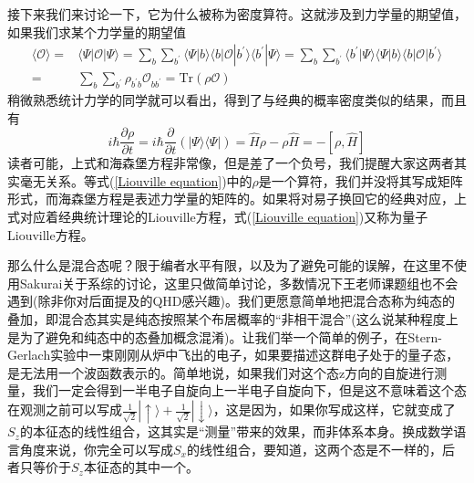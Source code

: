 \documentclass[12pt,a4paper,openany,twoside]{book}
\numberwithin{equation}{section}
\begin{document}
        接下来我们来讨论一下，它为什么被称为密度算符。这就涉及到力学量的期望值，如果我们求某个力学量的期望值
        \begin{equation}
          \begin{aligned}
            \langle\mathcal{O}\rangle=&\langle \Psi | \mathcal{O} | \Psi \rangle=\sum_{b}\sum_{b^\prime} \langle \Psi | b \rangle \langle b | \mathcal{O} | b^\prime \rangle \langle b^\prime | \Psi \rangle=\sum_{b}\sum_{b^\prime} \langle b^\prime | \Psi \rangle \langle \Psi | b \rangle \langle b | \mathcal{O} | b^\prime \rangle \\
            =&\sum_{b}\sum_{b^\prime}\rho_{b^\prime b}\mathcal{O}_{b b^\prime}=\text{Tr}(\rho \mathcal{O})
          \end{aligned}
        \end{equation}
        稍微熟悉统计力学的同学就可以看出，得到了与经典的概率密度类似的结果，而且有
        \begin{equation}
          i \hbar \frac{\partial \rho}{\partial t}=i \hbar \frac{\partial}{\partial t} \left(| \Psi \rangle \langle \Psi |\right)=\hat{H}\rho-\rho\hat{H}=-\left[\rho,\hat{H}\right]
          \label{Liouville equation}
        \end{equation}
        读者可能，上式和海森堡方程非常像，但是差了一个负号，我们提醒大家这两者其实毫无关系。等式(\ref{Liouville equation})中的$\rho$是一个算符，我们并没将其写成矩阵形式，而海森堡方程是表述力学量的矩阵的。如果将对易子换回它的经典对应，上式对应着经典统计理论的Liouville方程，式(\ref{Liouville equation})又称为量子Liouville方程。

        那么什么是混合态呢？限于编者水平有限，以及为了避免可能的误解，在这里不使用Sakurai关于系综的讨论\cite{J.J.Sakurai2010}，这里只做简单讨论，多数情况下王老师课题组也不会遇到(除非你对后面提及的QHD感兴趣)。我们更愿意简单地把混合态称为纯态的叠加，即混合态其实是纯态按照某个布居概率的“非相干混合”(这么说某种程度上是为了避免和纯态中的态叠加概念混淆)。让我们举一个简单的例子，在Stern-Gerlach实验中一束刚刚从炉中飞出的电子，如果要描述这群电子处于的量子态，是无法用一个波函数表示的。简单地说，如果我们对这个态z方向的自旋进行测量，我们一定会得到一半电子自旋向上一半电子自旋向下，但是这不意味着这个态在观测之前可以写成$\frac{1}{\sqrt{2}} | \uparrow \rangle +\frac{1}{\sqrt{2}} | \downarrow \rangle$，这是因为，如果你写成这样，它就变成了$S_z$的本征态的线性组合，这其实是“测量”带来的效果，而非体系本身。换成数学语言角度来说，你完全可以写成$S_x$的线性组合，要知道，这两个态是不一样的，后者只等价于$S_z$本征态的其中一个。
\end{document}
